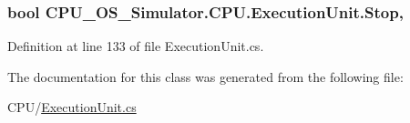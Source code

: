 \subsubsection[{Stop}]{\setlength{\rightskip}{0pt plus 5cm}bool C\+P\+U\+\_\+\+O\+S\+\_\+\+Simulator.\+C\+P\+U.\+Execution\+Unit.\+Stop\hspace{0.3cm}{\ttfamily [get]}, {\ttfamily [set]}}\label{class_c_p_u___o_s___simulator_1_1_c_p_u_1_1_execution_unit_a1b8748f1c6679263e5dc03fe382ad150}


Definition at line 133 of file Execution\+Unit.\+cs.



The documentation for this class was generated from the following file\+:\begin{DoxyCompactItemize}
\item 
C\+P\+U/\hyperlink{_execution_unit_8cs}{Execution\+Unit.\+cs}\end{DoxyCompactItemize}
